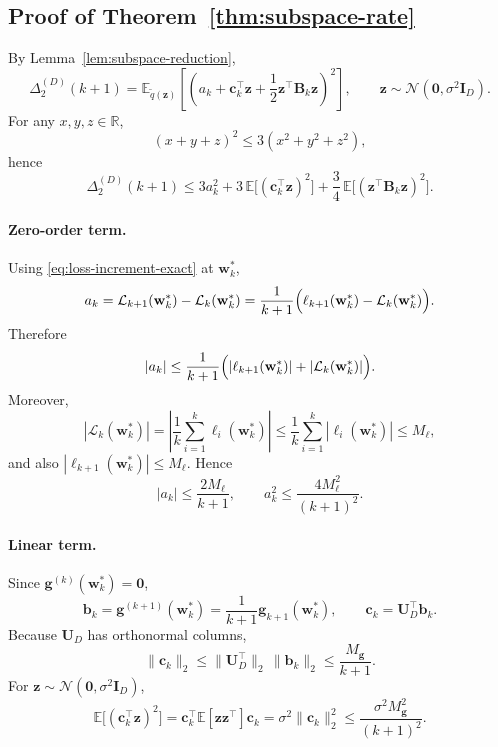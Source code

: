 \documentclass[10pt]{article}
\theoremstyle{plain}
\theoremstyle{remark}
\begin{document}
\subsection{Proof of Theorem~\ref{thm:subspace-rate}}

By Lemma~\ref{lem:subspace-reduction},
\[
\Delta_2^{(D)}(k+1)
=
\mathbb E_{\tilde q(\mathbf z)}
\left[
\left(
a_k+\mathbf c_k^\top\mathbf z+\frac12\mathbf z^\top\mathbf B_k\mathbf z
\right)^2
\right],
\qquad
\mathbf z\sim \mathcal N(\mathbf 0,\sigma^2\mathbf I_D).
\]
For any $x,y,z\in\mathbb R$,
\[
(x+y+z)^2\le 3(x^2+y^2+z^2),
\]
hence
\begin{equation}
\label{eq:app-thm-step1-new}
\Delta_2^{(D)}(k+1)
\le
3a_k^2
+
3\,\mathbb E\bigl[(\mathbf c_k^\top\mathbf z)^2\bigr]
+
\frac34\,\mathbb E\bigl[(\mathbf z^\top\mathbf B_k\mathbf z)^2\bigr].
\end{equation}

\paragraph{Zero-order term.}
Using \eqref{eq:loss-increment-exact} at $\mathbf w_k^*$,
\[
a_k
=
\mathcal L_{k+1}(\mathbf w_k^*)-\mathcal L_k(\mathbf w_k^*)
=
\frac{1}{k+1}\Bigl(\ell_{k+1}(\mathbf w_k^*)-\mathcal L_k(\mathbf w_k^*)\Bigr).
\]
Therefore
\[
|a_k|
\le
\frac{1}{k+1}
\Bigl(
|\ell_{k+1}(\mathbf w_k^*)|
+
|\mathcal L_k(\mathbf w_k^*)|
\Bigr).
\]
Moreover,
\[
|\mathcal L_k(\mathbf w_k^*)|
=
\left|
\frac1k\sum_{i=1}^k \ell_i(\mathbf w_k^*)
\right|
\le
\frac1k\sum_{i=1}^k |\ell_i(\mathbf w_k^*)|
\le
M_\ell,
\]
and also $|\ell_{k+1}(\mathbf w_k^*)|\le M_\ell$.
Hence
\begin{equation}
\label{eq:app-ak-sq-new}
|a_k|\le \frac{2M_\ell}{k+1},
\qquad
a_k^2\le \frac{4M_\ell^2}{(k+1)^2}.
\end{equation}

\paragraph{Linear term.}
Since $\mathbf g^{(k)}(\mathbf w_k^*)=\mathbf 0$,
\[
\mathbf b_k
=
\mathbf g^{(k+1)}(\mathbf w_k^*)
=
\frac{1}{k+1}\mathbf g_{k+1}(\mathbf w_k^*),
\qquad
\mathbf c_k=\mathbf U_D^\top\mathbf b_k.
\]
Because $\mathbf U_D$ has orthonormal columns,
\[
\|\mathbf c_k\|_2
\le
\|\mathbf U_D^\top\|_2\,\|\mathbf b_k\|_2
\le
\frac{M_{\mathbf g}}{k+1}.
\]
For $\mathbf z\sim\mathcal N(\mathbf 0,\sigma^2\mathbf I_D)$,
\begin{equation}
\label{eq:app-linear-new}
\mathbb E\bigl[(\mathbf c_k^\top\mathbf z)^2\bigr]
=
\mathbf c_k^\top \mathbb E[\mathbf z\mathbf z^\top]\mathbf c_k
=
\sigma^2\|\mathbf c_k\|_2^2
\le
\frac{\sigma^2 M_{\mathbf g}^2}{(k+1)^2}.
\end{equation}
\end{document}
